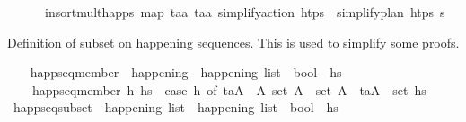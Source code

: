 \begin{isabellebody}
\ \ \ \ \ \ insort{\isacharunderscore}{\kern0pt}mult{\isacharunderscore}{\kern0pt}happs\ {\isacharparenleft}{\kern0pt}map\ {\isacharparenleft}{\kern0pt}{\isasymlambda}{\isacharparenleft}{\kern0pt}t\isactrlsub a{\isacharcomma}{\kern0pt}a{\isacharparenright}{\kern0pt}{\isachardot}{\kern0pt}\ {\isacharparenleft}{\kern0pt}t\isactrlsub a{\isacharcomma}{\kern0pt}{\isacharbrackleft}{\kern0pt}a{\isacharbrackright}{\kern0pt}{\isacharparenright}{\kern0pt}{\isacharparenright}{\kern0pt}\ {\isacharparenleft}{\kern0pt}simplify{\isacharunderscore}{\kern0pt}action\ htps\ {\isasympi}{\isacharparenright}{\kern0pt}{\isacharparenright}{\kern0pt}\ {\isacharparenleft}{\kern0pt}simplify{\isacharunderscore}{\kern0pt}plan\ htps\ {\isasympi}s{\isacharparenright}{\kern0pt}{\isachardoublequoteclose}%
\begin{isamarkuptext}%
Definition of subset on happening sequences. This is used to simplify some proofs.%
\end{isamarkuptext}\isamarkuptrue%
\ \ \isamarkupfalse%
\ happ{\isacharunderscore}{\kern0pt}seq{\isacharunderscore}{\kern0pt}member\ {\isacharcolon}{\kern0pt}{\isacharcolon}{\kern0pt}\ {\isachardoublequoteopen}happening\ {\isasymRightarrow}\ happening\ list\ {\isasymRightarrow}\ bool{\isachardoublequoteclose}\ {\isacharparenleft}{\kern0pt}\ {\isachardoublequoteopen}{\isasymin}\isactrlsub h\isactrlsub s{\isachardoublequoteclose}\ {}{}{\isacharparenright}{\kern0pt}\ \isanewline
\ \ \ \ {\isachardoublequoteopen}happ{\isacharunderscore}{\kern0pt}seq{\isacharunderscore}{\kern0pt}member\ h\ hs\ {\isasymlongleftrightarrow}\ {\isacharparenleft}{\kern0pt}case\ h\ of\ {\isacharparenleft}{\kern0pt}t\isactrlsub a{\isacharcomma}{\kern0pt}A{\isacharparenright}{\kern0pt}\ {\isasymRightarrow}\ {\isasymexists}A\ set\ A\ {\isasymsubseteq}\ set\ A\ {\isasymand}\ {\isacharparenleft}{\kern0pt}t\isactrlsub a{\isacharcomma}{\kern0pt}A\ {\isasymin}\ set\ hs{\isacharparenright}{\kern0pt}{\isachardoublequoteclose}\isanewline
\isanewline
\ \ \isamarkupfalse%
\ happ{\isacharunderscore}{\kern0pt}seq{\isacharunderscore}{\kern0pt}subset\ {\isacharcolon}{\kern0pt}{\isacharcolon}{\kern0pt}\ {\isachardoublequoteopen}happening\ list\ {\isasymRightarrow}\ happening\ list\ {\isasymRightarrow}\ bool{\isachardoublequoteclose}\ {\isacharparenleft}{\kern0pt}\ {\isachardoublequoteopen}{\isasymsubseteq}\isactrlsub h\isactrlsub s{\isachardoublequoteclose}\ {}{}{\isacharparenright}{\kern0pt}\ \isanewline

\end{isabellebody}
